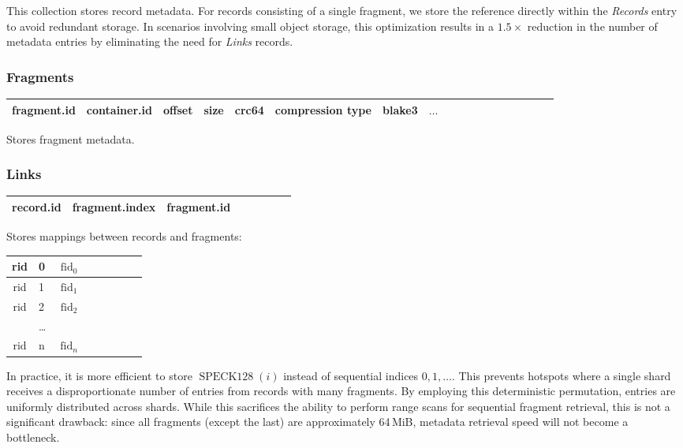 \documentclass[a4paper,12pt]{article}
\begin{document}
    \bigskip
    This collection stores record metadata. For records consisting of a single fragment, we store the reference directly within the \textit{Records} entry to avoid redundant storage. In scenarios involving small object storage, this optimization results in a $1.5\times$ reduction in the number of metadata entries by eliminating the need for \textit{Links} records.

    \subsubsection{Fragments}

    \noindent
    \begin{tabular}{|Sl|Sc|Sc|Sc|Sc|Sc|Sc|Sc|Sr|}
        \hline
        fragment.id & container.id & offset & size & crc64 & compression type & blake3 & $\dots$ \\
        \hline
    \end{tabular}

    \bigskip
    Stores fragment metadata.

    \subsubsection{Links}

    \noindent
    \begin{tabular}{|Sl|Sc|Sc|Sr|}
        \hline
        record.id & fragment.index & fragment.id \\
        \hline
    \end{tabular}

    \bigskip
    Stores mappings between records and fragments:
    \bigskip

    \noindent
    \begin{tabular}{|Sl|Sc|Sc|Sr|}
        \hline
        rid & 0     & $\operatorname{fid}_0$ \\
        \hline
        rid & 1     & $\operatorname{fid}_1$ \\
        \hline
        rid & 2     & $\operatorname{fid}_2$ \\
        \hline
        & \dots &                        \\
        \hline
        rid & n     & $\operatorname{fid}_n$ \\
        \hline
    \end{tabular}

    \bigskip
    In practice, it is more efficient to store $\operatorname{SPECK128}(i)$ instead of sequential indices $0, 1, \dots$. This prevents hotspots where a single shard receives a disproportionate number of entries from records with many fragments. By employing this deterministic permutation, entries are uniformly distributed across shards. While this sacrifices the ability to perform range scans for sequential fragment retrieval, this is not a significant drawback: since all fragments (except the last) are approximately 64\,MiB, metadata retrieval speed will not become a bottleneck.
\end{document}
